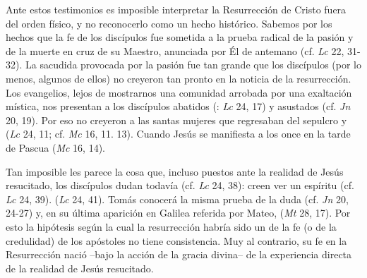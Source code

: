 \begin{ccebody}
 Ante estos testimonios es imposible interpretar la Resurrección de Cristo fuera del orden físico, y no reconocerlo como un hecho histórico. Sabemos por los hechos que la fe de los discípulos fue sometida a la prueba radical de la pasión y de la muerte en cruz de su Maestro, anunciada por Él de antemano (cf. \textit{Lc} 22, 31-32). La sacudida provocada por la pasión fue tan grande que los discípulos (por lo menos, algunos de ellos) no creyeron tan pronto en la noticia de la resurrección. Los evangelios, lejos de mostrarnos una comunidad arrobada por una exaltación mística, nos presentan a los discípulos abatidos (: \textit{Lc} 24, 17) y asustados (cf. \textit{Jn} 20, 19). Por eso no creyeron a las santas mujeres que regresaban del sepulcro y  (\textit{Lc} 24, 11; cf. \textit{Mc} 16, 11. 13). Cuando Jesús se manifiesta a los once en la tarde de Pascua  (\textit{Mc} 16, 14).

 Tan imposible les parece la cosa que, incluso puestos ante la realidad de Jesús resucitado, los discípulos dudan todavía (cf. \textit{Lc} 24, 38): creen ver un espíritu (cf. \textit{Lc} 24, 39).  (\textit{Lc} 24, 41). Tomás conocerá la misma prueba de la duda (cf. \textit{Jn} 20, 24-27) y, en su última aparición en Galilea referida por Mateo,  (\textit{Mt} 28, 17). Por esto la hipótesis según la cual la resurrección habría sido un  de la fe (o de la credulidad) de los apóstoles no tiene consistencia. Muy al contrario, su fe en la Resurrección nació –bajo la acción de la gracia divina– de la experiencia directa de la realidad de Jesús resucitado.

\newpage 



\end{ccebody}
